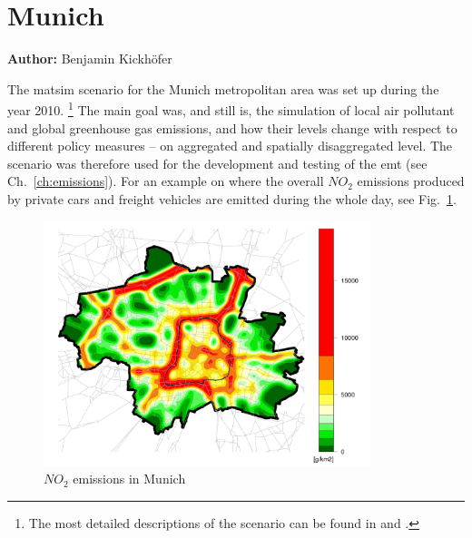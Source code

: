 \section{Munich}
\label{ch:scenarios:munich}
\hfill \textbf{Author:} Benjamin Kickh\"ofer

The \acrshort{matsim} scenario for the Munich metropolitan area was set up during the year 2010.%
%
\footnote{
%
The most detailed descriptions of the scenario can be found in \citet{KickhoeferEtAl_VanoutriveVerhetsel_2013} and \citet{Kickhoefer_PhDThesis_2014}.
%
}
%
The main goal was, and still is, the simulation of local air pollutant and global greenhouse gas emissions, and how their levels change with respect to different policy measures -- on aggregated and spatially disaggregated level. The scenario was therefore used for the development and testing of the \gls{emt} (see Ch.~\ref{ch:emissions}). For an example on where the overall $\mathit{NO_2}$ emissions produced by private cars and freight vehicles are emitted during the whole day, see Fig.~\ref{fig:munich:no2emissions}.

\begin{figure}
\includegraphics[width=0.85\textwidth]{./using/figures/baseCase_1500_NO2_g_108000_0.png}
\caption{$\mathit{NO_2}$ emissions in Munich}
\label{fig:munich:no2emissions}
\end{figure}

